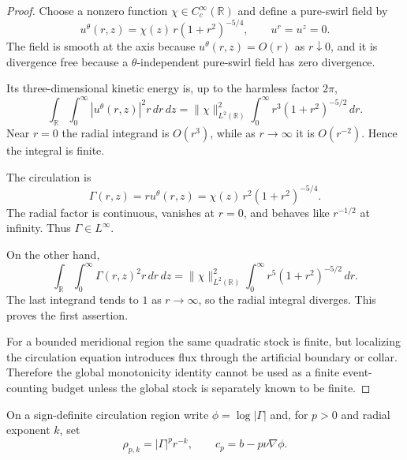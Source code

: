 \documentclass[11pt]{article}
\theoremstyle{definition}\newtheorem{definition}[theorem]{Definition}
\theoremstyle{remark}\newtheorem{remark}[theorem]{Remark}
\begin{document}
\begin{proof}
Choose a nonzero function \(\chi\in C_c^\infty(\mathbb R)\) and define a pure-swirl
field by
\[
 u^\theta(r,z)=\chi(z)\,r(1+r^2)^{-5/4},
 \qquad
 u^r=u^z=0.
\]
The field is smooth at the axis because \(u^\theta(r,z)=O(r)\) as \(r\downarrow0\),
and it is divergence free because a \(\theta\)-independent pure-swirl field has
zero divergence.

Its three-dimensional kinetic energy is, up to the harmless factor \(2\pi\),
\[
 \int_{\mathbb R}\!\int_0^\infty |u^\theta(r,z)|^2r\,dr\,dz
 =
 \|\chi\|_{L^2(\mathbb R)}^2
 \int_0^\infty r^3(1+r^2)^{-5/2}\,dr.
\]
Near \(r=0\) the radial integrand is \(O(r^3)\), while as \(r\to\infty\) it is
\(O(r^{-2})\).  Hence the integral is finite.

The circulation is
\[
 \Gamma(r,z)
 =
 r u^\theta(r,z)
 =
 \chi(z)\,r^2(1+r^2)^{-5/4}.
\]
The radial factor is continuous, vanishes at \(r=0\), and behaves like
\(r^{-1/2}\) at infinity.  Thus \(\Gamma\in L^\infty\).

On the other hand,
\[
 \int_{\mathbb R}\!\int_0^\infty \Gamma(r,z)^2r\,dr\,dz
 =
 \|\chi\|_{L^2(\mathbb R)}^2
 \int_0^\infty r^5(1+r^2)^{-5/2}\,dr.
\]
The last integrand tends to \(1\) as \(r\to\infty\), so the radial integral
diverges.  This proves the first assertion.

For a bounded meridional region the same quadratic stock is finite, but
localizing the circulation equation introduces flux through the artificial
boundary or collar.  Therefore the global monotonicity identity cannot be
used as a finite event-counting budget unless the global stock is separately
known to be finite.
\end{proof}

On a sign-definite circulation region write $\phi=\log|\Gamma|$ and, for
$p>0$ and radial exponent $k$, set
\[
 \rho_{p,k}=|\Gamma|^p r^{-k},\qquad
 c_p=b-p\nu\nabla\phi.
\]
\end{document}
